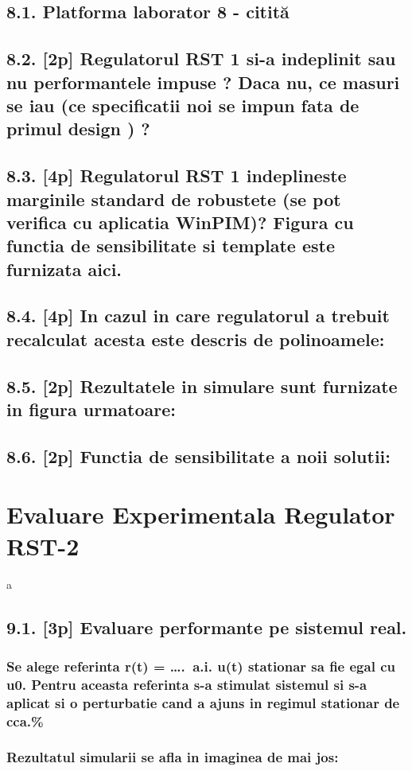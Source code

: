 \documentclass[12pt,english]{article}
\begin{document}
\subsection { 8.1. Platforma laborator 8 - citită }
\subsection { 8.2. [2p] Regulatorul RST 1 si-a indeplinit sau nu performantele impuse ?  Daca nu, ce masuri se iau (ce specificatii noi se impun fata de primul design ) ? }
\subsection { 8.3. [4p] Regulatorul RST 1 indeplineste marginile standard de robustete (se pot verifica cu aplicatia WinPIM)?   Figura cu functia de sensibilitate si template este furnizata aici. }
\subsection { 8.4. [4p] In cazul in care regulatorul a trebuit recalculat acesta este descris de polinoamele: }
\subsection { 8.5. [2p] Rezultatele in simulare sunt furnizate in figura urmatoare: }
\subsection { 8.6. [2p] Functia de sensibilitate a noii solutii: }

\section { Evaluare Experimentala Regulator RST-2 }
a
\subsection { 9.1. [3p] Evaluare performante pe sistemul real. }
\subsubsection { Se alege referinta r(t) = ….  a.i. u(t) stationar sa fie egal cu u0. Pentru aceasta referinta s-a stimulat sistemul si s-a aplicat si o perturbatie cand a ajuns in regimul stationar de cca.\% }
\subsubsection { Rezultatul simularii se afla in imaginea de mai jos: }
\end{document}
